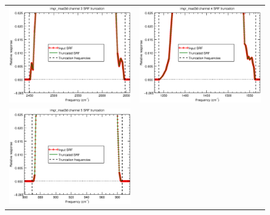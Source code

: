 \begin{figure}[H]
  \centering
  \begin{tabular}{c c}
    \includegraphics[scale=0.35]{graphics/imgr/trunc/imgr_insat3d-3.trunc.eps} &
    \includegraphics[scale=0.35]{graphics/imgr/trunc/imgr_insat3d-4.trunc.eps} \\
    \includegraphics[scale=0.35]{graphics/imgr/trunc/imgr_insat3d-5.trunc.eps} &

\end{tabular}
\end{figure}
